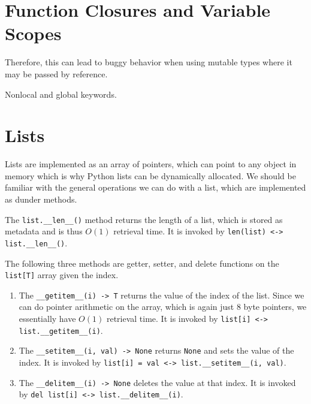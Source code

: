 \documentclass{article}
\begin{document}
\section{Function Closures and Variable Scopes}

  Therefore, this can lead to buggy behavior when using mutable types where it may be passed by reference. 

  Nonlocal and global keywords. 

\section{Lists}

  Lists are implemented as an array of pointers, which can point to any object in memory which is why Python lists can be dynamically allocated. We should be familiar with the general operations we can do with a list, which are implemented as dunder methods. 

  \begin{definition}[Length]
    The \texttt{list.\_\_len\_\_()} method returns the length of a list, which is stored as metadata and is thus $O(1)$ retrieval time. It is invoked by \texttt{len(list) <-> list.\_\_len\_\_()}. 
  \end{definition}

  \begin{definition}
    The following three methods are getter, setter, and delete functions on the \texttt{list[T]} array given the index. 
    \begin{enumerate}
      \item The \texttt{\_\_getitem\_\_(i) -> T} returns the value of the index of the list. Since we can do pointer arithmetic on the array, which is again just 8 byte pointers, we essentially have $O(1)$ retrieval time. It is invoked by \texttt{list[i] <-> list.\_\_getitem\_\_(i)}. 
      \item The \texttt{\_\_setitem\_\_(i, val) -> None} returns \texttt{None} and sets the value of the index. It is invoked by \texttt{list[i] = val <-> list.\_\_setitem\_\_(i, val)}. 
      \item The \texttt{\_\_delitem\_\_(i) -> None} deletes the value at that index. It is invoked by \texttt{del list[i] <-> list.\_\_delitem\_\_(i)}. 
    \end{enumerate}
  \end{definition}
\end{document}
